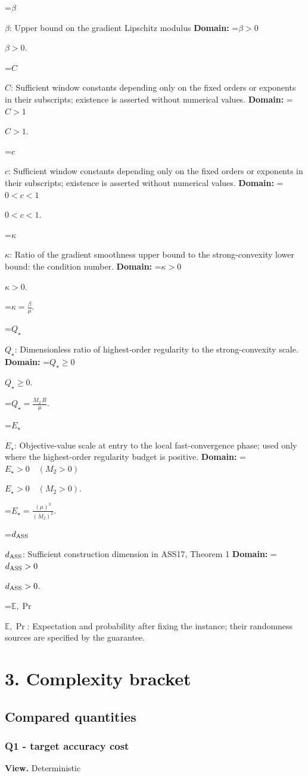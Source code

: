\documentclass[10pt,a4paper]{article}
\newcommand{\AtlasMath}[1]{\par\begingroup\centering\setbox0=\hbox{$\displaystyle #1$}\ifdim\wd0>1.4\linewidth\typeout{ATLAS WIDE FORMULA: \the\wd0}\fi\ifdim\wd0>\linewidth\resizebox{\linewidth}{!}{\box0}\else\box0\fi\par\endgroup}
\newcommand{\AtlasInlineMath}[1]{\begingroup\setbox0=\hbox{$#1$}\ifdim\wd0>.4\linewidth\endgroup\AtlasMath{#1}\else\endgroup$#1$\fi}
\begin{document}
\AtlasInlineMath{\beta}: Upper bound on the gradient Lipschitz modulus \textbf{Domain:} \AtlasInlineMath{\beta>0}.

\AtlasInlineMath{C}: Sufficient window constants depending only on the fixed orders or exponents in their subscripts; existence is asserted without numerical values. \textbf{Domain:} \AtlasInlineMath{C>1}.

\AtlasInlineMath{c}: Sufficient window constants depending only on the fixed orders or exponents in their subscripts; existence is asserted without numerical values. \textbf{Domain:} \AtlasInlineMath{0<c<1}.

\AtlasInlineMath{\kappa}: Ratio of the gradient smoothness upper bound to the strong-convexity lower bound: the condition number. \textbf{Domain:} \AtlasInlineMath{\kappa>0}.


\AtlasMath{\kappa=\frac{\beta}{\mu}.}


\AtlasInlineMath{Q_\star}: Dimensionless ratio of highest-order regularity to the strong-convexity scale. \textbf{Domain:} \AtlasInlineMath{Q_\star\ge0}.


\AtlasMath{Q_\star=\frac{M_2\,R}{\mu}.}


\AtlasInlineMath{E_\star}: Objective-value scale at entry to the local fast-convergence phase; used only where the highest-order regularity budget is positive. \textbf{Domain:} \AtlasInlineMath{E_\star>0\quad(M_2>0)}.


\AtlasMath{E_\star=\frac{(\mu)^{3}}{(M_2)^{2}}.}


\AtlasInlineMath{d_{\rm ASS}}: Sufficient construction dimension in ASS17, Theorem 1 \textbf{Domain:} \AtlasInlineMath{d_{\rm ASS}>0}.

\AtlasInlineMath{\mathbb{E},\Pr}: Expectation and probability after fixing the instance; their randomness sources are specified by the guarantee.

\section{3. Complexity bracket}
\subsection{Compared quantities}
\subsubsection{Q1 - target accuracy cost}
\textbf{View.} Deterministic
\end{document}
